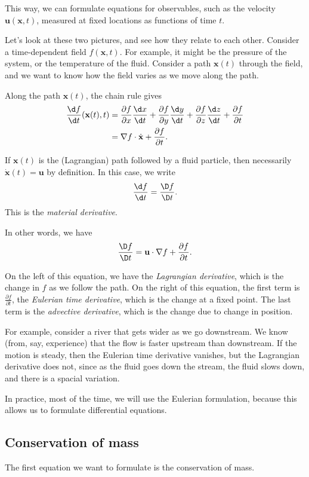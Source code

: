 \documentclass[a4paper]{article}
\begin{document}
This way, we can formulate equations for observables, such as the velocity $\mathbf{u}(\mathbf{x}, t)$, measured at fixed locations as functions of time $t$.

Let's look at these two pictures, and see how they relate to each other. Consider a time-dependent field $f(\mathbf{x}, t)$. For example, it might be the pressure of the system, or the temperature of the fluid. Consider a path $\mathbf{x}(t)$ through the field, and we want to know how the field varies as we move along the path.

Along the path $\mathbf{x}(t)$, the chain rule gives
\begin{align*}
  \frac{\d f}{\d t}(\mathbf{x}(t), t) &= \frac{\partial f}{\partial x} \frac{\d x}{\d t} + \frac{\partial f}{\partial y}\frac{\d y}{\d t} + \frac{\partial f}{\partial z}\frac{\d z}{\d t} + \frac{\partial f}{\partial t}\\
  &= \nabla f \cdot \dot{\mathbf{x}} + \frac{\partial f}{\partial t}.
\end{align*}
\begin{defi}
  If $\mathbf{x}(t)$ is the (Lagrangian) path followed by a fluid particle, then necessarily $\dot{\mathbf{x}}(t) = \mathbf{u}$ by definition. In this case, we write
  \[
    \frac{\d f}{\d t} = \frac{\D f}{\D t}.
  \]
  This is the \emph{material derivative}.

  In other words, we have
  \[
    \frac{\D f}{\D t} = \mathbf{u}\cdot \nabla f + \frac{\partial f}{\partial t}.
  \]
\end{defi}
On the left of this equation, we have the \emph{Lagrangian derivative}, which is the change in $f$ as we follow the path. On the right of this equation, the first term is $\frac{\partial f}{\partial t}$, the \emph{Eulerian time derivative}, which is the change at a fixed point. The last term is the \emph{advective derivative}, which is the change due to change in position.

For example, consider a river that gets wider as we go downstream. We know (from, say, experience) that the flow is faster upstream than downstream. If the motion is steady, then the Eulerian time derivative vanishes, but the Lagrangian derivative does not, since as the fluid goes down the stream, the fluid slows down, and there is a spacial variation.

In practice, most of the time, we will use the Eulerian formulation, because this allows us to formulate differential equations.

\subsection{Conservation of mass}
The first equation we want to formulate is the conservation of mass.
\end{document}
